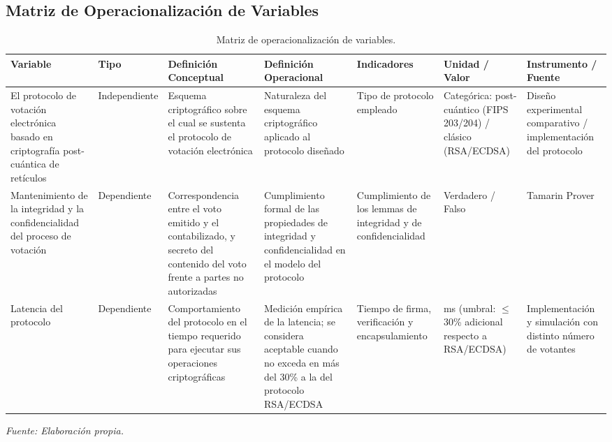 \subsection{Matriz de Operacionalización de Variables}
\begingroup
\renewcommand{\arraystretch}{1.3}
\scriptsize
\setlength{\tabcolsep}{3pt}
\begin{longtable}{|>{\raggedright\arraybackslash}p{2.0cm}|>{\raggedright\arraybackslash}p{1.6cm}|>{\raggedright\arraybackslash}p{2.2cm}|>{\raggedright\arraybackslash}p{2.4cm}|>{\raggedright\arraybackslash}p{1.8cm}|>{\raggedright\arraybackslash}p{1.9cm}|>{\raggedright\arraybackslash}p{1.9cm}|}
	\caption{Matriz de operacionalización de variables.}
	\label{tab:operacionalizacion}\\
	\hline
	\textbf{Variable} &
	\textbf{Tipo} &
	\textbf{Definición Conceptual} &
	\textbf{Definición Operacional} &
	\textbf{Indicadores} &
	\textbf{Unidad / Valor} &
	\textbf{Instrumento / Fuente} \\
	\hline
	El protocolo de votación electrónica basado en criptografía post-cuántica de retículos &
	Independiente &
	Esquema criptográfico sobre el cual se sustenta el protocolo de votación electrónica &
	Naturaleza del esquema criptográfico aplicado al protocolo diseñado &
	Tipo de protocolo empleado &
	Categórica: post-cuántico (FIPS 203/204) / clásico (RSA/ECDSA) &
	Diseño experimental comparativo / implementación del protocolo \\
	\hline
	Mantenimiento de la integridad y la confidencialidad del proceso de votación &
	Dependiente &
	Correspondencia entre el voto emitido y el contabilizado, y secreto del contenido del voto frente a partes no autorizadas &
	Cumplimiento formal de las propiedades de integridad y confidencialidad en el modelo del protocolo &
	Cumplimiento de los lemmas de integridad y de confidencialidad &
	Verdadero / Falso &
	Tamarin Prover \\
	\hline
	Latencia del protocolo &
	Dependiente &
	Comportamiento del protocolo en el tiempo requerido para ejecutar sus operaciones criptográficas &
	Medición empírica de la latencia; se considera aceptable cuando no exceda en más del 30\% a la del protocolo RSA/ECDSA &
	Tiempo de firma, verificación y encapsulamiento &
	ms (umbral: $\le$ 30\% adicional respecto a RSA/ECDSA) &
	Implementación y simulación con distinto número de votantes \\
	\hline
\end{longtable}
\par\vspace{-12pt}
\begin{center}
	\footnotesize\textit{Fuente: Elaboración propia.}
\end{center}
\endgroup